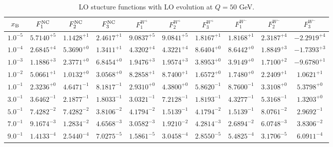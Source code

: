 \begin{table}[h]
\begin{adjustbox}{width=\textwidth}
\begin{tabular}{|c||c|c|c|c|c|c|c|c|c|}
\hline
$x_{\rm B}$ & $F_1^{\rm NC}$ & $F_2^{\rm NC}$ & $F_3^{\rm NC}$ & $F_1^{W^+}$ & $F_2^{W^+}$ & $F_3^{W^+}$ & $F_1^{W^-}$ & $F_2^{W^-}$ & $F_3^{W^-}$ \\
\hline
$ 1.0^{-5}$ & $ 5.7140^{+5}$ & $ 1.1428^{+1}$ & $ 2.4617^{+1}$ & $ 9.0837^{+5}$ & $ 9.0841^{+5}$ & $ 1.8167^{+1}$ & $ 1.8168^{+1}$ & $ 2.3187^{+4}$ & $-2.2919^{+4}$ \\
$ 1.0^{-4}$ & $ 2.6845^{+4}$ & $ 5.3690^{+0}$ & $ 1.3411^{+1}$ & $ 4.3202^{+4}$ & $ 4.3221^{+4}$ & $ 8.6404^{+0}$ & $ 8.6442^{+0}$ & $ 1.8849^{+3}$ & $-1.7393^{+3}$ \\
$ 1.0^{-3}$ & $ 1.1886^{+3}$ & $ 2.3771^{+0}$ & $ 6.8454^{+0}$ & $ 1.9476^{+3}$ & $ 1.9574^{+3}$ & $ 3.8953^{+0}$ & $ 3.9149^{+0}$ & $ 1.7100^{+2}$ & $-9.6780^{+1}$ \\
$ 1.0^{-2}$ & $ 5.0661^{+1}$ & $ 1.0132^{+0}$ & $ 3.0568^{+0}$ & $ 8.2858^{+1}$ & $ 8.7400^{+1}$ & $ 1.6572^{+0}$ & $ 1.7480^{+0}$ & $ 2.2409^{+1}$ & $ 1.0621^{+1}$ \\
$ 1.0^{-1}$ & $ 2.3236^{+0}$ & $ 4.6471^{-1}$ & $ 8.1817^{-1}$ & $ 2.9310^{+0}$ & $ 4.3800^{+0}$ & $ 5.8620^{-1}$ & $ 8.7600^{-1}$ & $ 3.3108^{+0}$ & $ 5.3798^{+0}$ \\
$ 3.0^{-1}$ & $ 3.6462^{-1}$ & $ 2.1877^{-1}$ & $ 1.8033^{-1}$ & $ 3.0321^{-1}$ & $ 7.2128^{-1}$ & $ 1.8193^{-1}$ & $ 4.3277^{-1}$ & $ 5.3168^{-1}$ & $ 1.3203^{+0}$ \\
$ 5.0^{-1}$ & $ 7.4282^{-2}$ & $ 7.4282^{-2}$ & $ 3.8106^{-2}$ & $ 4.1794^{-2}$ & $ 1.5139^{-1}$ & $ 4.1794^{-2}$ & $ 1.5139^{-1}$ & $ 8.0761^{-2}$ & $ 2.9692^{-1}$ \\
$ 7.0^{-1}$ & $ 9.1674^{-3}$ & $ 1.2834^{-2}$ & $ 4.6568^{-3}$ & $ 3.0582^{-3}$ & $ 1.9210^{-2}$ & $ 4.2814^{-3}$ & $ 2.6894^{-2}$ & $ 6.0748^{-3}$ & $ 3.8306^{-2}$ \\
$ 9.0^{-1}$ & $ 1.4133^{-4}$ & $ 2.5440^{-4}$ & $ 7.0275^{-5}$ & $ 1.5861^{-5}$ & $ 3.0458^{-4}$ & $ 2.8550^{-5}$ & $ 5.4825^{-4}$ & $ 3.1706^{-5}$ & $ 6.0911^{-4}$ \\
\hline
\end{tabular}
\end{adjustbox}\caption{LO stucture functions with LO evolution at $Q = 50$ GeV.}
\label{tab:N0LO-Q50}
\end{table}


